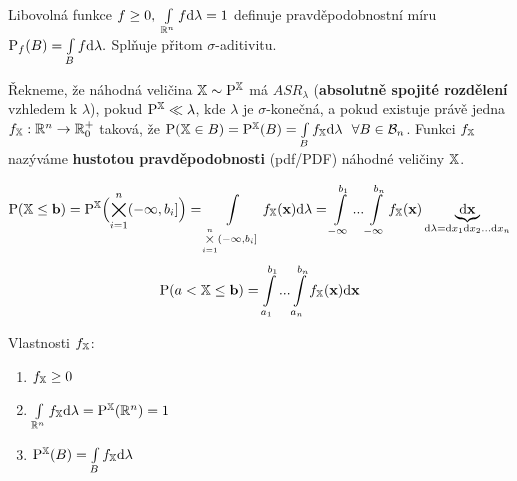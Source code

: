 \begin{remark}
	Libovolná funkce $f\geq 0,~ \int\limits_{\mathbb{R}^n} f \mathrm{d}\lambda=1$ definuje pravděpodobnostní míru $ \mathrm{P}_f(B)=\int\limits_Bf\mathrm{d}\lambda.$ Splňuje přitom $\sigma$-aditivitu.
\end{remark}
\begin{define}
Řekneme, že náhodná veličina $\mathbb{X}\sim \mathrm{P}^{\mathbb{X}}$ má $ASR_\lambda$ (\textbf{absolutně spojité rozdělení} vzhledem k $\lambda$), pokud $\mathrm{P}^{\mathbb{X}}\ll \lambda$, kde $\lambda$ je $\sigma$-konečná, a pokud existuje právě jedna $f_{\mathbb{X}}:\mathbb{R}^n\to\mathbb{R}_{0}^{+}$ taková, že $\mathrm{P}(\mathbb{X}\in B) = \mathrm{P}^{\mathbb{X}}(B)=\int\limits_{B} f_{\mathbb{X}} \mathrm{d}\lambda~~\forall B\in\mathcal{B}_n$. Funkci $f_{\mathbb{X}}$ nazýváme \textbf{hustotou pravděpodobnosti} (pdf/PDF) náhodné veličiny $\mathbb{X}$.
\end{define}
\begin{remark}
	$$ \mathrm{P}(\mathbb{X}\leq \textbf{b})= \mathrm{P}^{\mathbb{X}}\Bigl(\bigtimes\limits_{i=1}^n(-\infty,b_i]\Bigr)=\int\limits_{\bigtimes\limits_{i=1}^n(-\infty,b_i]} f_{\mathbb{X}}(\textbf{x})\mathrm{d}\lambda=\int\limits_{-\infty}^{b_1}...\int\limits_{-\infty}^{b_n}f_{\mathbb{X}}(\textbf{x})\underbrace{\mathrm{d}\textbf{x}}_{\mathrm{d}\lambda = \mathrm{d} x_1\mathrm{d} x_2...\mathrm{d} x_n} $$
	$$ \mathrm{P}(a<\mathbb{X}\leq \textbf{b})=\int\limits_{a_1}^{b_1}...\int\limits_{a_n}^{b_n}f_{\mathbb{X}}(\textbf{x})\mathrm{d}\textbf{x} $$
\end{remark}

\begin{remark}
Vlastnosti $f_{\mathbb{X}}$: \begin{enumerate}
	\item $f_{\mathbb{X}} \geq 0$
	\item $\int\limits_{\mathbb{R}^n} f_{\mathbb{X}} \mathrm{d}\lambda = \mathrm{P}^{\mathbb{X}}(\mathbb{R}^n)=1$
	\item $\mathrm{P}^{\mathbb{X}}(B) = \int\limits_B f_{\mathbb{X}} \mathrm{d}\lambda$
\end{enumerate}
\end{remark}

